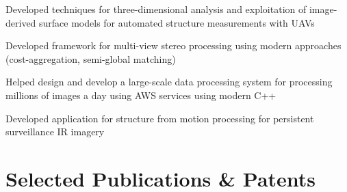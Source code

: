 \documentclass[]{nilosek-resume}
\begin{document}
\begin{minipage}[t]{0.7\textwidth}
\begin{tightemize}
	\item Developed techniques for three-dimensional analysis and exploitation of image-derived surface models for automated structure measurements with UAVs
	\item Developed framework for multi-view stereo processing using modern approaches (cost-aggregation, semi-global matching)
	\item Helped design and develop a large-scale data processing system for processing millions of images a day using AWS services using modern C++
\end{tightemize}
\sectionsep

\begin{tightemize}
	\item Developed application for structure from motion processing for persistent surveillance IR imagery
\end{tightemize}


\section{Selected Publications \& Patents}
\renewcommand\refname{\vskip - 0.8cm} %


\nocite{*}


\end{minipage} 
\end{document}
